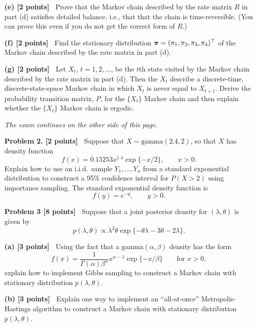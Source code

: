 \documentclass{article}
\newcommand{\svskip}{\vspace{.2in}}
\newcommand{\lvskip}{\vspace{.5in}}
\def\vec#1{\mathchoice{\mbox{\boldmath$\displaystyle\bf#1$}}
{\mbox{\boldmath$\textstyle\bf#1$}}
{\mbox{\boldmath$\scriptstyle\bf#1$}}
{\mbox{\boldmath$\scriptscriptstyle\bf#1$}}}
\begin{document}
\svskip
{\bf(e) [2 points]\ }
Prove that the Markov chain described by the rate matrix $R$ in part (d) 
satisfies detailed balance, i.e., that that the chain is time-reversible.  
(You can prove this even if you do not get the correct
form of $R$.)

\svskip
{\bf(f) [2 points]\ }
Find the stationary distribution $\vec \pi=(\pi_1, \pi_2, \pi_3, \pi_4)^\top$ of the Markov chain
described by the rate matrix in part (d).

\svskip
{\bf(g) [2 points]\ }
Let $X_t$, $t=1, 2, \ldots$, be the $t$th state visited by the Markov chain described by the
rate matrix in part (d).  Then the $X_t$ describe a discrete-time, discrete-state-space Markov
chain in which $X_t$ is never equal to $X_{t+1}$.  Derive the probability transition matrix,
$P$, for the $\{X_t\}$ Markov chain and then explain whether the $\{X_t\}$ Markov chain is ergodic.

\svskip
\begin{center}
{\em The exam continues on the other side of this page.}
\end{center}

\newpage
{\bf Problem 2. [2 points]\ }
Suppose that $X\sim\mbox{gamma}(2.4,2)$, so that $X$ has density function
\[
f(x) = 0.15253x^{1.4}\exp\{-x/2\}, \qquad x>0.
\]
Explain how to use an i.i.d.~sample $Y_1, \ldots, Y_n$ from a standard exponential
distribution to construct 
a 95\% confidence interval for  $P(X>2)$ using importance sampling.
The standard exponential density function is
\[
f(y) = e^{-y}, \qquad y>0.
\]




\lvskip
{\bf Problem 3 [8 points]\ }
Suppose that a joint posterior density for $(\lambda, \theta)$ is
given by
\[
p(\lambda, \theta) \propto
\lambda^2 \theta\exp\{-\theta\lambda - 3\theta - 2\lambda\} .
\]

\svskip
{\bf(a) [3 points]\ }
Using the fact that a $\mbox{gamma}(\alpha, \beta)$ density has the form
\[
f(x) = \frac{1}{\Gamma(\alpha)\beta^\alpha} x^{\alpha-1} \exp\{-x/\beta\}
\qquad \mbox{for $x>0$},
\]
explain how to implement Gibbs sampling to construct a Markov chain 
with stationary distribution $p(\lambda, \theta)$.

\svskip
{\bf(b) [3 points]\ }
Explain one way to implement an ``all-at-once'' Metropolis-Hastings algorithm
to construct a Markov chain with stationary distribution $p(\lambda, \theta)$.
\end{document}
